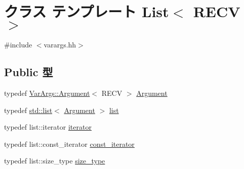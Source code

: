 \hypertarget{classVarArgs_1_1List}{
\section{クラス テンプレート List$<$ RECV $>$}
\label{classVarArgs_1_1List}
}


{\ttfamily \#include $<$varargs.hh$>$}\subsection*{Public 型}
\begin{DoxyCompactItemize}
\item 
typedef \hyperlink{structVarArgs_1_1Argument}{VarArgs::Argument}$<$ RECV $>$ \hyperlink{classVarArgs_1_1List_acff7b954174428461e00022e37040cce}{Argument}
\item 
typedef \hyperlink{classstd_1_1list}{std::list}$<$ \hyperlink{structVarArgs_1_1Argument}{Argument} $>$ \hyperlink{classVarArgs_1_1List_a21297939c7021f4ce84d850f600d957b}{list}
\item 
typedef list::iterator \hyperlink{classVarArgs_1_1List_a7b3d64cd6c8b24e05929cb79fde1049d}{iterator}
\item 
typedef list::const\_\-iterator \hyperlink{classVarArgs_1_1List_afeee0934dfd283471330395273877511}{const\_\-iterator}
\item 
typedef list::size\_\-type \hyperlink{classVarArgs_1_1List_a1451245dcc01455eaef625ded39c247e}{size\_\-type}
\end{DoxyCompactItemize}

